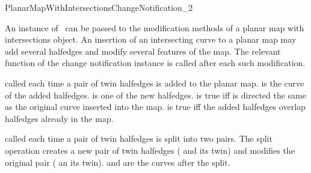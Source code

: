 
\ccRefPageBegin

\begin{ccRefConcept}{PlanarMapWithIntersectionsChangeNotification_2}

\ccDefinition
   An instance of \ccRefName\ can be passed to the modification
   methods of a planar map with intersections object. An insertion
   of an intersecting curve to a planar map may add several
   halfedges and modify several features of the map. The relevant
   function of the change notification instance is called after
   each such modification.

\ccTypes
{}

\ccOperations


  {called each time a pair of twin halfedges is added to the planar map.
   is the curve of the added halfedges.
   is one of the new halfedges.
   is true iff  is directed the same as the
  original curve inserted into the map.
   is true iff the added halfedges overlap halfedges already in the
  map.}

  {called each time a pair of twin halfedges is split into two
  pairs. The split operation creates a new pair of twin halfedges
  ( and its twin) and modifies the original
  pair ( an its twin).
   and  are the curves after the split.
  }


\end{ccRefConcept}
